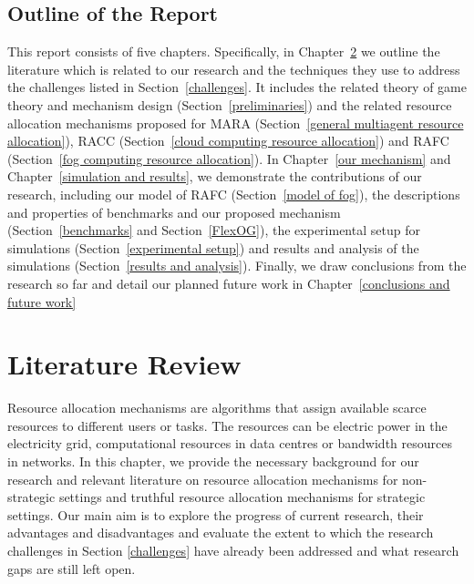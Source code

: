 \documentclass[11pt]{phdthesis}
\begin{document}
\section{Outline of the Report} \label{outline}
This report consists of five chapters. Specifically, in Chapter~\ref{literature review} we outline the literature which is related to our research and the techniques they use to address the challenges listed in Section~\ref{challenges}. It includes the related theory of game theory and mechanism design (Section~\ref{preliminaries}) and the related resource allocation mechanisms proposed for MARA (Section~\ref{general multiagent resource allocation}), RACC (Section~\ref{cloud computing resource allocation}) and RAFC (Section~\ref{fog computing resource allocation}). In Chapter~\ref{our mechanism} and Chapter~\ref{simulation and results}, we demonstrate the contributions of our research, including our model of RAFC (Section~\ref{model of fog}), the descriptions and properties of benchmarks and our proposed mechanism (Section~\ref{benchmarks} and Section~\ref{FlexOG}), the experimental setup for simulations (Section~\ref{experimental setup}) and results and analysis of the simulations (Section~\ref{results and analysis}). Finally, we draw conclusions from the research so far and detail our planned future work in Chapter~\ref{conclusions and future work}


\chapter{Literature Review} \label{literature review}

Resource allocation mechanisms are algorithms that assign available scarce resources to different users or tasks. The resources can be electric power in the electricity grid, computational resources in data centres or bandwidth resources in networks. In this chapter, we provide the necessary background for our research and relevant literature on resource allocation mechanisms for non-strategic settings and truthful resource allocation mechanisms for strategic settings. Our main aim is to explore the progress of current research, their advantages and disadvantages and evaluate the extent to which the research challenges in Section \ref{challenges} have already been addressed and what research gaps are still left open.
\end{document}
